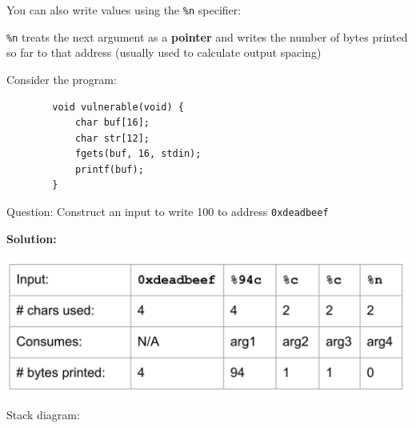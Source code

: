 \documentclass{article}
\begin{document}
You can also write values using the \lstinline{%n} specifier:

    \lstinline{%n} treats the next argument as a \textbf{pointer} and writes the number of bytes printed so far to that address (usually used to calculate output spacing)

\begin{example}[\%n example]
    Consider the program:
    \begin{lstlisting}
        void vulnerable(void) {
            char buf[16];
            char str[12];
            fgets(buf, 16, stdin);
            printf(buf);
        }
    \end{lstlisting}

    {\color{red} Question:} Construct an input to write 100 to address \lstinline{0xdeadbeef}

    \textbf{Solution:}
    \begin{center}
        \includegraphics[scale=0.4]{images/solution-to-example-n.png} \\
    \end{center}
    Stack diagram:


\end{example}
\end{document}
